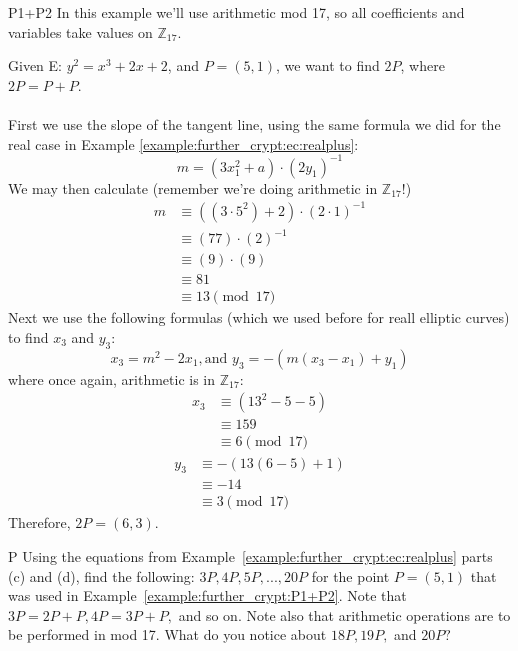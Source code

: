 \begin{example}{P1+P2} In this example we'll use arithmetic mod 17, so  all coefficients and variables take values on $\mathbb{Z}_{17}$.  

Given E: $y^2 = x^3 + 2x + 2$, and $P = (5,1)$,  we want to find $2P$, where $2P = P + P$.\\ \\
First we use the slope of the tangent line, using the same formula we did for the real case in Example \ref{example:further_crypt:ec:realplus}:	
\[m = (3x_1^2 + a) \cdot (2y_1)^{-1}\]	
We may then calculate (remember we're doing arithmetic in  $\mathbb{Z}_{17}$!)
\begin{align*}
		m &\equiv ( (3 \cdot 5^2) + 2) \cdot (2 \cdot 1)^{-1} \\
	          &\equiv  (77) \cdot (2)^{-1} \\
                     &\equiv (9) \cdot (9)\\
                     &\equiv 81 \\
                    &\equiv 13 \pmod{17}
		\end{align*}
Next we use the following formulas (which we used before for reall elliptic curves) to find $x_3$ and $y_3$: \[ x_3 = m^2 - 2x_1  , \text{and~} y_3 =-(  m(x_3 - x_1)+y_1)\]
where once again, arithmetic is in $\mathbb{Z}_{17}$:
\begin{align*}
		x_3 &\equiv  (13^2 - 5 - 5 ) \\
	          &\equiv 159\\
                     &\equiv 6 \pmod{17}
		\end{align*}
			\begin{align*}
		y_3 &\equiv - (13(6 - 5) +1) \\
	          &\equiv -14\\
                     &\equiv 3 \pmod{17}
		\end{align*}
Therefore, $2P = (6,3)$.
\end{example}

\begin{exercise}{P}
Using the equations from Example~\ref{example:further_crypt:ec:realplus} parts (c) and (d), find the following: $3P, 4P, 5P, ..., 20P$ for the point $P=(5,1)$ that was used in Example~\ref{example:further_crypt:P1+P2}.  Note that $3P = 2P + P,  4P = 3P +P,$ and so on. Note also that arithmetic operations are to be performed in mod 17.  What do you notice about $18P,  19P,$ and $20P?$
\end{exercise}

